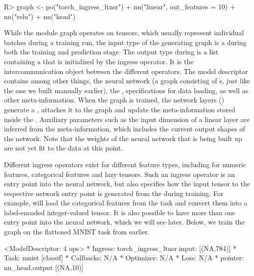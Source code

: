\documentclass[article]{jss}
\theoremstyle{definition}
\begin{document}
\begin{CodeInput}
R> graph <- po("torch_ingress_ltnsr") %
+    nn("linear", out_features = 10) %
+    nn("relu") %
+    nn("head")
\end{CodeInput}

While the module graph operates on tensors, which usually represent individual batches during a training run, the input type of the generating graph is a  during both the training and prediction stage.
The output type during  is a list containing a  that is initialized by the  ingress operator.
It is the intercommunication object between the different  operators.
The model descriptor contains among other things, the neural network (a graph consisting of s, just like the one we built manually earlier), the , specifications for data loading, as well as other meta-information.
When the graph is trained, the network layers () generate a , attaches it to the graph and update the meta-information stored inside the .
Auxiliary parameters such as the input dimension of a linear layer are inferred from the meta-information, which includes the current output shapes of the network.
Note that the weights of the neural network that is being built up are not yet fit to the data at this point.

Different ingress operators exist for different feature types, including for numeric features, categorical features and lazy tensors.
Such an ingress operator is an entry point into the neural network, but also specifies how the input tensor to the respective network entry point is generated from the  during training.
For example,  will load the categorical features from the task and convert them into a label-encoded integer-valued tensor.
It is also possible to have more than one entry point into the neural network, which we will see later.
Below, we train the graph on the flattened MNIST task from earlier.

\begin{CodeOutput}
<ModelDescriptor: 4 ops>
* Ingress:  torch_ingress_ltnsr.input: [(NA,784)]
* Task:  mnist [classif]
* Callbacks:  N/A
* Optimizer:  N/A
* Loss:  N/A
* pointer:  nn_head.output [(NA,10)]
\end{CodeOutput}
\end{document}
